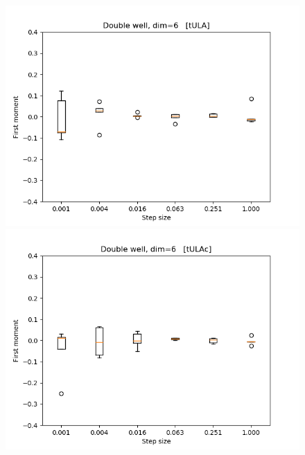 \begin{figure}[H]
\centering
  \begin{minipage}[b]{0.32\textwidth}
  \centering
    \includegraphics[width=\textwidth]{Figures/tula_fm.png}
  \end{minipage} %
  \begin{minipage}[b]{0.32\textwidth}
  \centering
    \includegraphics[width=\textwidth]{Figures/tulac_fm.png}
  \end{minipage} %
  \begin{minipage}[b]{0.32\textwidth}
  \centering

\end{minipage}
\end{figure}

